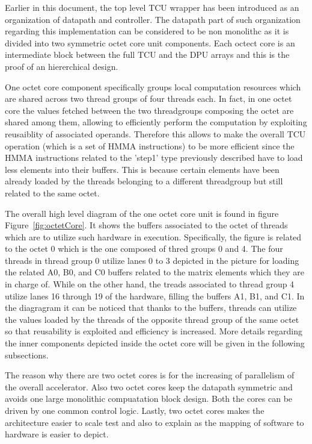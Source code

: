 Earlier in this document, the top level TCU wrapper has been introduced as an organization of datapath and controller. The datapath part of such organization regarding this implementation can be considered to be non monolithc as it is divided into two symmetric octet core unit components. Each octect core is an intermediate block between the full TCU and the DPU arrays and this is the proof of an hiererchical design.

One octet core component specifically groups local computation resources which are shared across two thread groups of four threads each. In fact, in one octet core the values fetched between the two threadgroups composing the octet are shared among them, allowing to efficiently perform the computation by exploiting reusaiblity of associated operands. Therefore this allows to make the overall TCU operation (which is a set of HMMA instructions) to be more efficient since the HMMA instructions related to the 'step1' type previously described have to load less elements into their buffers. This is because certain elements have been already loaded by the threads belonging to a different threadgroup but still related to the same octet. 

The overall high level diagram of the one octet core unit is found in figure Figure~\ref{fig:octetCore}. It shows the buffers associated to the octet of threads which are to utilize such hardware in execution. Specifically, the figure is related to the octet 0 which is the one composed of thred groups 0 and 4. The four threads in thread group 0 utilize lanes 0 to 3 depicted in the picture for loading the related A0, B0, and C0 buffers related to the matrix elements which they are in charge of. While on the other hand, the treads associated to thread group 4 utilize lanes 16 through 19 of the hardware, filling the buffers A1, B1, and C1. In the diagragram it can be noticed that thanks to the buffers, threads can utilize the values loaded by the threads of the opposite thread group of the same octet so that reusability is exploited and efficiency is increased. More details regarding the inner components depicted inside the octet core will be given in the following subsections. 

The reason why there are two octet cores is for the increasing of parallelism of the overall accelerator. Also two octet cores keep the datapath symmetric and avoids one large monolithic compuatation block design. Both the cores can be driven by one common control logic. Lastly, two octet cores makes the architecture easier to scale test and also to explain as the mapping of software to hardware is easier to depict.  

